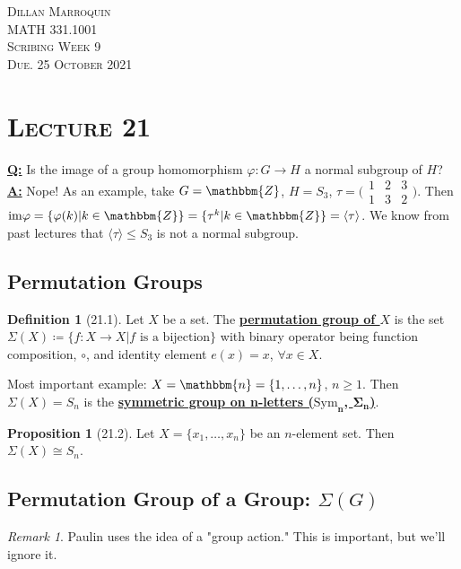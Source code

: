 \documentclass{article}
\newcommand{\Z}{\mathbbm{Z}}
\newcommand{\coleq}{\coloneqq}
\newcommand{\define}[1]{\textbf{\underline{#1}}}
\newcommand{\func}[3]{#1: #2 \to #3}
\theoremstyle{definition}
\newtheorem*{defn}{Definition}
\newtheorem*{prop}{Proposition}
\theoremstyle{remark}
\newtheorem*{rmk}{Remark}
\newcommand{\cyc}[1]{\langle#1\rangle}
\newcommand{\im}[1]{\mathrm{im}#1}
\newcommand{\iso}{\cong}
\begin{document}
    \begin{center}
        \textsc{Dillan Marroquin\\MATH 331.1001\\Scribing Week 9\\Due. 25 October 2021\\}
    \end{center}
        
    \section*{\textbf{\textsc{Lecture 21}}}{
        \define{Q:} Is the image of a group homomorphism $\func{\varphi}{G}{H}$ a normal subgroup of $H$?\\
        \define{A:} Nope! As an example, take $G=\Z$, $H=S_3$, $\tau=\big(\begin{smallmatrix} 1&2&3\\ 1&3&2 \end{smallmatrix}\big)$. Then $\im\varphi=\{\varphi(k)|k\in \Z\}=\{\tau^k|k\in \Z\}=\cyc{\tau}$. We know from past lectures that $\cyc{\tau}\leq S_3$ is not a normal subgroup.
        
        \subsection*{Permutation Groups}{
            \begin{defn}[21.1]
                Let $X$ be a set. The \define{permutation group of $X$} is the set $\Sigma(X)\coleq\{\func{f}{X}{X}|f\text{ is a bijection}\}$ with binary operator being function composition, $\circ$, and identity element $e(x)=x$, $\forall x\in X$.
            \end{defn}
            
            \noindent Most important example: $X=\mathbbm{n}=\{1,\ldots,n\}$, $n\geq 1$. Then $\Sigma(X)=S_n$ is the \define{symmetric group on n-letters ($\mathbf{\mathrm{Sym}_n}$, $\mathbf{\Sigma_n}$)}.
        
            \begin{prop}[21.2]
                Let $X=\{x_1,\ldots,x_n\}$ be an $n$-element set. Then $\Sigma(X)\iso S_n$.
            \end{prop}
        }
        \subsection*{Permutation Group of a Group: $\Sigma(G)$}{
            \begin{rmk}
                Paulin uses the idea of a "group action." This is important, but we'll ignore it.
            \end{rmk}
            
}}
\end{document}
